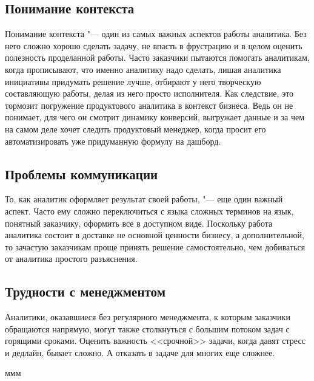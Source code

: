 \documentclass[referat, times]{SCWorks}
\begin{document}
\subsection{Понимание контекста}
Понимание контекста "--- один из самых важных аспектов работы аналитика. Без него сложно хорошо сделать задачу, не впасть в фрустрацию и в целом оценить полезность проделанной работы. Часто заказчики пытаются помогать аналитикам, когда прописывают, что именно аналитику надо сделать, лишая аналитика инициативы придумать решение лучше, отбирают у него творческую составляющую работы, делая из него просто исполнителя. Как следствие, это тормозит погружение продуктового аналитика в контекст бизнеса. Ведь он не понимает, для чего он смотрит динамику конверсий, выгружает данные и за чем на самом деле хочет следить продуктовый менеджер, когда просит его автоматизировать уже придуманную формулу на дашборд.

\subsection{Проблемы коммуникации}
То, как аналитик оформляет результат своей работы, "--- еще один важный аспект. Часто ему сложно переключиться с языка сложных терминов на язык, понятный заказчику, оформить все в доступном виде. Поскольку работа аналитика состоит в доставке не основной ценности бизнесу, а дополнительной, то зачастую заказчикам проще принять решение самостоятельно, чем добиваться от аналитика простого разъяснения.

\subsection{Трудности с менеджментом}
Аналитики, оказавшиеся без регулярного менеджмента, к которым заказчики обращаются напрямую, могут также столкнуться с большим потоком задач с горящими сроками. Оценить важность <<срочной>> задачи, когда давят стресс и дедлайн, бывает сложно. А отказать в задаче для многих еще сложнее\cite{pilyavskaya}.



\conclusion
ммм
\nocite{*}




\appendix
\end{document}
